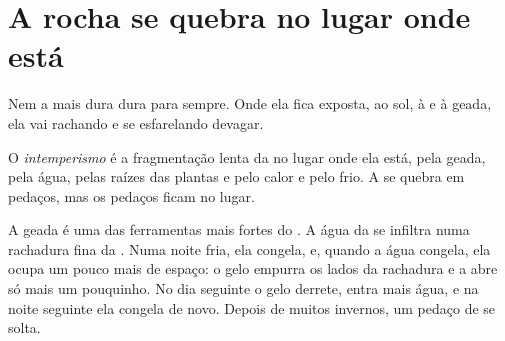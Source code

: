 \section{A rocha se quebra no lugar onde está}

Nem a  mais dura dura para sempre. Onde ela fica exposta, ao sol, à
 e à geada, ela vai rachando e se esfarelando devagar.

\begin{definition}[Intemperismo]\label{def:g5:water-shapes-the-land:weathering}
O \emph{intemperismo} é a fragmentação lenta da  no
lugar onde ela está, pela geada, pela água, pelas raízes das plantas e pelo
calor e pelo frio. A  se quebra em pedaços, mas os pedaços ficam no lugar.
\end{definition}

A geada é uma das ferramentas mais fortes do . A água da
 se infiltra numa rachadura fina da . Numa noite fria, ela
congela, e, quando a água congela, ela ocupa um pouco mais de espaço: o
gelo empurra os lados da rachadura e a abre só mais um pouquinho. No dia
seguinte o gelo derrete, entra mais água, e na noite seguinte ela congela
de novo. Depois de muitos invernos, um pedaço de  se solta.

